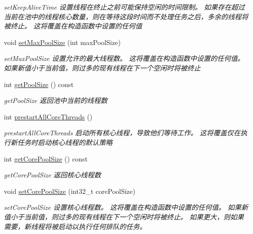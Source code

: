 \begin{DoxyCompactItemize}
\begin{DoxyCompactList}\small\item\em set\+Keep\+Alive\+Time 设置线程在终止之前可能保持空闲的时间限制。 如果存在超过当前在池中的线程核心数量，则在等待这段时间而不处理任务之后，多余的线程将被终止。 这将覆盖在构造函数中设置的任何值 \end{DoxyCompactList}\item 
void \hyperlink{classThreadPoolExecutor_a83e9e3715fdacc5b2f08b563d39bb62b}{set\+Max\+Pool\+Size} (int max\+Pool\+Size)
\begin{DoxyCompactList}\small\item\em set\+Max\+Pool\+Size 设置允许的最大线程数。 这将覆盖在构造函数中设置的任何值。 如果新值小于当前值，则过多的现有线程在下一个空闲时将被终止 \end{DoxyCompactList}\item 
int \hyperlink{classThreadPoolExecutor_af67082427f76bd9b14b2dabf43f96300}{get\+Pool\+Size} () const
\begin{DoxyCompactList}\small\item\em get\+Pool\+Size 返回池中当前的线程数 \end{DoxyCompactList}\item 
int \hyperlink{classThreadPoolExecutor_ad7dd8949ce60dd7b835dae26ea4e7e88}{prestart\+All\+Core\+Threads} ()
\begin{DoxyCompactList}\small\item\em prestart\+All\+Core\+Threads 启动所有核心线程，导致他们等待工作。 这将覆盖仅在执行新任务时启动核心线程的默认策略 \end{DoxyCompactList}\item 
int \hyperlink{classThreadPoolExecutor_a9099318ba5cab5dd05f219babba4b6b7}{get\+Core\+Pool\+Size} () const
\begin{DoxyCompactList}\small\item\em get\+Core\+Pool\+Size 返回核心线程数 \end{DoxyCompactList}\item 
void \hyperlink{classThreadPoolExecutor_abfe18006cc84a2f314114d0a8626aa08}{set\+Core\+Pool\+Size} (int32\+\_\+t core\+Pool\+Size)
\begin{DoxyCompactList}\small\item\em set\+Core\+Pool\+Size 设置核心线程数。 这将覆盖在构造函数中设置的任何值。 如果新值小于当前值，则过多的现有线程在下一个空闲时将被终止。 如果更大，则如果需要，新线程将被启动以执行任何排队的任务。 \end{DoxyCompactList}\item 

\end{DoxyCompactItemize}
